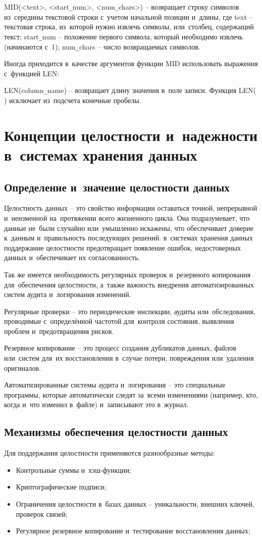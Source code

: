 \documentclass{ou}
\begin{document}
MID(<text>, <start\verb|_|num>, <num\verb|_|chars>) -- возвращает строку символов из~середины текстовой строки с~учетом начальной позиции и~длины, где text -- текстовая строка, из~которой нужно извлечь символы, или~столбец, содержащий текст; start\verb|_|num -- положение первого символа, который необходимо извлечь (начинаются с~1); num\verb|_|chars -- число возвращаемых символов.

Иногда приходится в~качестве аргументов функции MID использовать выражения с~функцией LEN: 
 
LEN(column\verb|_|name) -- возвращает длину значения в~поле записи. Функция LEN( ) исключает из~подсчета конечные пробелы.

\section{Концепции целостности и~надежности в~системах хранения данных}
\subsection{Определение и~значение целостности данных}
Целостность данных -- это свойство информации оставаться точной, непрерывной и~неизменной на~протяжении всего жизненного цикла. Она подразумевает, что данные не~были случайно или~умышленно искажены, что обеспечивает доверие к~данным и~правильность последующих решений. в~системах хранения данных поддержание целостности предотвращает появление ошибок, недостоверных данных и~обеспечивает их согласованность.

Так же имеется необходимость регулярных проверок и~резервного копирования для~обеспечения целостности, а~также важность внедрения автоматизированных систем аудита и~логирования изменений.

Регулярные проверки -- это периодические инспекции, аудиты или~обследования, проводимые с~определённой частотой для~контроля состояния, выявления проблем и~предотвращения рисков.

Резервное копирование -- это процесс создания дубликатов данных, файлов или~систем для~их восстановления в~случае потери, повреждения или~удаления оригиналов.

Автоматизированные системы аудита и~логирования -- это специальные программы, которые автоматически следят за~всеми изменениями (например, кто, когда и~что изменил в~файле) и~записывают это в~журнал.
\subsection{Механизмы обеспечения целостности данных}
Для поддержания целостности применяются разнообразные методы:
\begin{itemize}[label=-, itemindent=4em, nosep]
\item Контрольные суммы и~хэш-функции;
\item Криптографические подписи;
\item Ограничения целостности в~базах данных -- уникальности, внешних ключей, проверок связей;
\item Регулярное резервное копирование и~тестирование восстановления данных;
\end{itemize}
\end{document}
